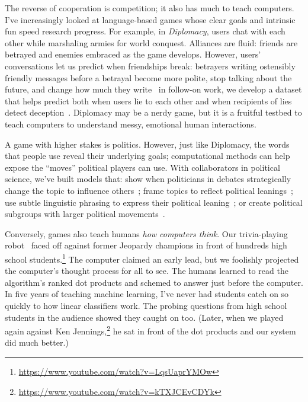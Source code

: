 \documentclass[11pt]{amsart}
\begin{document}
The reverse of cooperation is competition; it also has much to teach computers.
I've increasingly looked at language-based games whose clear goals and
intrinsic fun speed research progress. For example, in \emph{Diplomacy}, users
chat with each other while marshaling armies for world conquest. Alliances are
fluid: friends are betrayed and enemies embraced as the game develops. However,
users' conversations let us predict when friendships break: betrayers writing
ostensibly friendly messages before a betrayal become more polite, stop talking
about the future, and change how much they write~\cite{niculae-15} in follow-on
work, we develop a dataset that helps predict both when users lie to each other
and when recipients of lies detect deception~\cite{Peskov-20}. Diplomacy may be
a nerdy game, but it is a fruitful testbed to teach computers to understand
messy, emotional human interactions.

A game with higher stakes is politics. However, just like Diplomacy, the words
that people use reveal their underlying goals; computational methods can help
expose the ``moves'' political players can use. With collaborators in political
science, we've built models that: show when politicians in debates
strategically change the topic to influence others~\cite{nguyen-12,Nguyen-14b};
frame topics to reflect political leanings~\cite{nguyen-13:shlda}; use subtle
linguistic phrasing to express their political leaning~\cite{iyyer-14a}; or
create political subgroups with larger political
movements~\cite{Nguyen:Boyd-Graber:Resnik:Miler-2015}.

Conversely, games also teach humans \emph{how computers think}.  Our
trivia-playing robot~\cite{boyd-graber-12,iyyer-14b,iyyer-15} faced off against
former Jeopardy champions in front of hundreds high school
students.\footnote{\url{https://www.youtube.com/watch?v=LqsUaprYMOw}} The
computer claimed an early lead, but we foolishly projected the computer's
thought process for all to see.  The humans learned to read the algorithm's
ranked dot products and schemed to answer just before the computer. In five
years of teaching machine learning, I've never had students catch on so quickly
to how linear classifiers work.  The probing questions from high school students
in the audience showed they caught on too.  (Later, when we played again against
Ken Jennings,\footnote{\url{https://www.youtube.com/watch?v=kTXJCEvCDYk}} he sat
in front of the dot products and our system did much better.)
\end{document}
